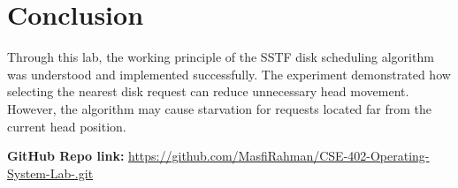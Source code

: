 \documentclass[12pt,a4paper]{article}
\begin{document}
\section{Conclusion}
Through this lab, the working principle of the SSTF disk scheduling algorithm was understood and implemented successfully. The experiment demonstrated how selecting the nearest disk request can reduce unnecessary head movement. However, the algorithm may cause starvation for requests located far from the current head position.

\vspace{2cm}
\noindent \textbf{GitHub Repo link:} \href{https://github.com/MasfiRahman/CSE-402-Operating-System-Lab-.git}{https://github.com/MasfiRahman/CSE-402-Operating-System-Lab-.git}
\end{document}
